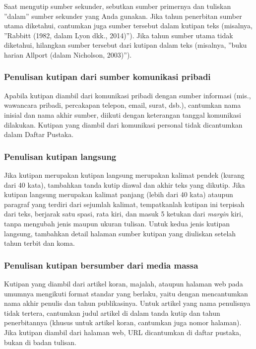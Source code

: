 \documentclass[
  indonesian,
  letterpaper,
]{scrbook}
\begin{document}
Saat mengutip sumber sekunder, sebutkan sumber primernya dan tuliskan
''dalam'' sumber sekunder yang Anda gunakan. Jika tahun penerbitan
sumber utama diketahui, cantumkan juga sumber tersebut dalam kutipan
teks (misalnya, ''Rabbitt (1982, dalam Lyon dkk., 2014)''). Jika tahun
sumber utama tidak diketahui, hilangkan sumber tersebut dari kutipan
dalam teks (misalnya, ''buku harian Allport (dalam Nicholson, 2003)'').

\subsubsection{Penulisan kutipan dari sumber komunikasi
pribadi}\label{penulisan-kutipan-dari-sumber-komunikasi-pribadi}

Apabila kutipan diambil dari komunikasi pribadi dengan sumber informasi
(mis., wawancara pribadi, percakapan telepon, email, surat, dsb.),
cantumkan nama inisial dan nama akhir sumber, diikuti dengan keterangan
tanggal komunikasi dilakukan. Kutipan yang diambil dari komunikasi
personal tidak dicantumkan dalam Daftar Pustaka.

\subsubsection{Penulisan kutipan
langsung}\label{penulisan-kutipan-langsung}

Jika kutipan merupakan kutipan langsung merupakan kalimat pendek (kurang
dari 40 kata), tambahkan tanda kutip diawal dan akhir teks yang dikutip.
Jika kutipan langsung merupakan kalimat panjang (lebih dari 40 kata)
ataupun paragraf yang terdiri dari sejumlah kalimat, tempatkanlah
kutipan ini terpisah dari teks, berjarak satu spasi, rata kiri, dan
masuk 5 ketukan dari \emph{margin} kiri, tanpa mengubah jenis maupun
ukuran tulisan. Untuk kedua jenis kutipan langsung, tambahkan detail
halaman sumber kutipan yang diuliskan setelah tahun terbit dan koma.

\subsubsection{Penulisan kutipan bersumber dari media
massa}\label{penulisan-kutipan-bersumber-dari-media-massa}

Kutipan yang diambil dari artikel koran, majalah, ataupun halaman web
pada umumnya mengikuti format standar yang berlaku, yaitu dengan
mencantumkan nama akhir penulis dan tahun publikasinya. Untuk artikel
yang nama penulisnya tidak tertera, cantumkan judul artikel di dalam
tanda kutip dan tahun penerbitannya (khusus untuk artikel koran,
cantumkan juga nomor halaman). Jika kutipan diambil dari halaman web,
URL dicantumkan di daftar pustaka, bukan di badan tulisan.
\end{document}
